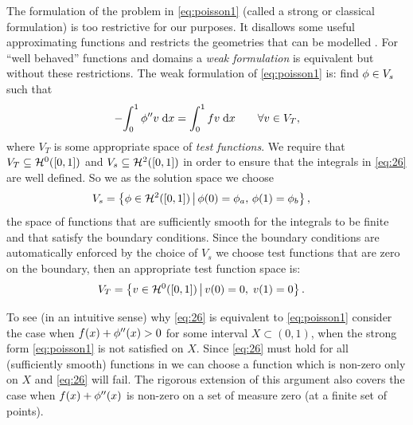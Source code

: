The formulation of the problem in \cref{eq:poisson1} (called a strong or classical formulation) is too restrictive for our purposes.
It disallows some useful approximating functions and restricts the geometries that can be modelled \cite[14]{HowardElmanDavidSilvester2006}.
For ``well behaved'' functions and domains a \emph{weak formulation} is equivalent but without these restrictions.
The weak formulation of \cref{eq:poisson1} is: find $\phi\in V_{s}$ such that
\begin{equation}
  -{\int_0^1 \phi'' v {\; \mathrm{{d}}}{x}} = {\int_0^1 f v {\; \mathrm{{d}}}{x}} \qquad \forall v \in V_{T},
  \label{eq:26}
\end{equation}
where $V_{T}$ is some appropriate space of \emph{test functions}.
We require that $V_{T}\subseteq \mathcal{H}^0([0,1])$ and $V_s \subseteq \mathcal{H}^2([0,1])$ in order to ensure that the integrals in \cref{eq:26} are well defined.
So we as the solution space we choose
\begin{equation}
  \begin{aligned}
    V_{s} &= \left\{ {\phi \in \mathcal{H}^2([0,1])} \,\middle|\, {\phi(0) = \phi_{a},\, \phi(1) = \phi_{b}} \right\},
  \end{aligned}
\end{equation}
\ie the space of functions that are sufficiently smooth for the integrals to be finite and that satisfy the boundary conditions.
Since the boundary conditions are automatically enforced by the choice of $V_s$ we choose test functions that are zero on the boundary, then an appropriate test function space is:
\begin{equation}
  \label{eq:28}
  \begin{aligned}
    V_{T} &= \left\{ { v \in \mathcal{H}^0([0,1]) } \,\middle|\, { v(0) =0,\; v(1)=0 } \right\}.
  \end{aligned}
\end{equation}

To see (in an intuitive sense) why \cref{eq:26} is equivalent to \cref{eq:poisson1} consider the case when $f(x) + \phi''(x) > 0$ for some interval $X \subset (0,1)$, \ie when the strong form \cref{eq:poisson1} is not satisfied on $X$.
Since \cref{eq:26} must hold for all (sufficiently smooth) functions in we can choose a function which is non-zero only on $X$ and \cref{eq:26} will fail.
The rigorous extension of this argument also covers the case when $f(x) + \phi''(x)$ is non-zero on a set of measure zero (\eg at a finite set of points).

